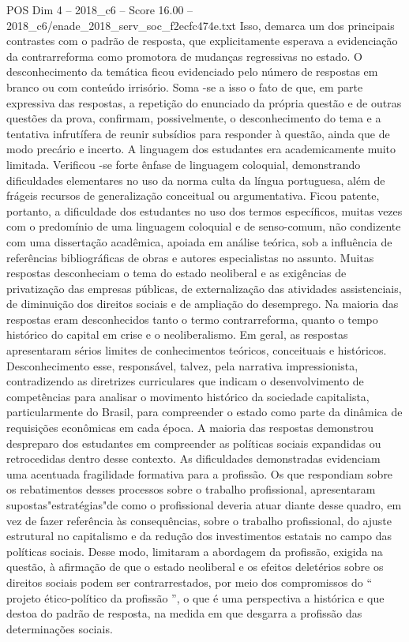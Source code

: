 \begin{textsample}{POS Dim 4 – 2018\_c6 – Score 16.00 – 2018\_c6/enade\_2018\_serv\_soc\_f2ecfc474e.txt}
Isso, demarca um dos principais contrastes com o padrão de resposta, que explicitamente esperava a evidenciação da contrarreforma como promotora de mudanças regressivas no estado.
O desconhecimento da temática ficou evidenciado pelo número de respostas em branco ou com conteúdo irrisório.
Soma -se a isso o fato de que, em parte expressiva das respostas, a repetição do enunciado da própria questão e de outras questões da prova, confirmam, possivelmente, o desconhecimento do tema e a tentativa infrutífera de reunir subsídios para responder à questão, ainda que de modo precário e incerto.
A linguagem dos estudantes era academicamente muito limitada.
Verificou -se forte ênfase de linguagem coloquial, demonstrando dificuldades elementares no uso da norma culta da língua portuguesa, além de frágeis recursos de generalização conceitual ou argumentativa.
Ficou patente, portanto, a dificuldade dos estudantes no uso dos termos específicos, muitas vezes com o predomínio de uma linguagem coloquial e de senso-comum, não condizente com uma dissertação acadêmica, apoiada em análise teórica, sob a influência de referências bibliográficas de obras e autores especialistas no assunto.
Muitas respostas desconheciam o tema do estado neoliberal e as exigências de privatização das empresas públicas, de externalização das atividades assistenciais, de diminuição dos direitos sociais e de ampliação do desemprego.
Na maioria das respostas eram desconhecidos tanto o termo contrarreforma, quanto o tempo histórico do capital em crise e o neoliberalismo.
Em geral, as respostas apresentaram sérios limites de conhecimentos teóricos, conceituais e históricos.
Desconhecimento esse, responsável, talvez, pela narrativa impressionista, contradizendo as diretrizes curriculares que indicam o desenvolvimento de competências para analisar o movimento histórico da sociedade capitalista, particularmente do Brasil, para compreender o estado como parte da dinâmica de requisições econômicas em cada época.
A maioria das respostas demonstrou despreparo dos estudantes em compreender as políticas sociais expandidas ou retrocedidas dentro desse contexto.
As dificuldades demonstradas evidenciam uma acentuada fragilidade formativa para a profissão.
Os que respondiam sobre os rebatimentos desses processos sobre o trabalho profissional, apresentaram supostas"estratégias"de como o profissional deveria atuar diante desse quadro, em vez de fazer referência às consequências, sobre o trabalho profissional, do ajuste estrutural no capitalismo e da redução dos investimentos estatais no campo das políticas sociais.
Desse modo, limitaram a abordagem da profissão, exigida na questão, à afirmação de que o estado neoliberal e os efeitos deletérios sobre os direitos sociais podem ser contrarrestados, por meio dos compromissos do “ projeto ético-político da profissão ”, o que é uma perspectiva a histórica e que destoa do padrão de resposta, na medida em que desgarra a profissão das determinações sociais.

\end{textsample}
